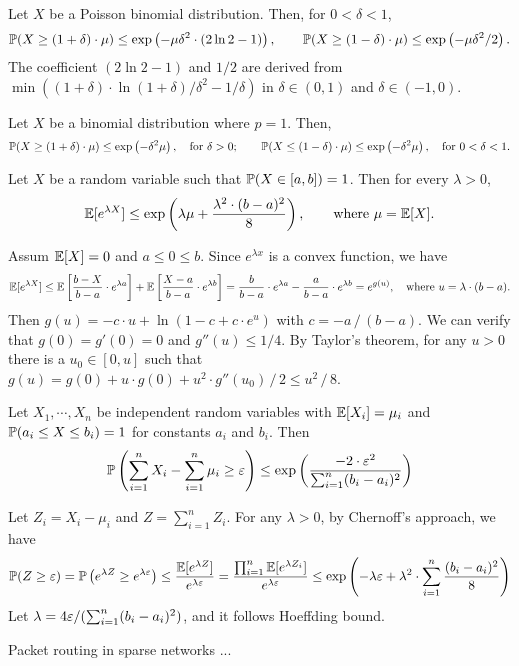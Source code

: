 \documentclass[main.tex]{subfiles}
\begin{document}
\begin{corollary}
	Let $X$ be a Poisson binomial distribution. Then, for $0<\delta<1$, 
	\[\mathbb{P}(X\ge(1+\delta)\cdot\mu)\le \exp\left(-\mu\delta^2\cdot (2\ln 2-1)\right),\qquad\mathbb{P}(X\ge(1-\delta)\cdot\mu)\le \exp\left(-\mu\delta^2/2\right).\]
	The coefficient $(2\ln 2-1)$ and $1/2$ are derived from $\min((1+\delta)\cdot \ln(1+\delta)/\delta^2 - 1/ \delta)$ in $\delta\in(0,1)$ and $\delta\in(-1,0)$.
\end{corollary}

\begin{theorem}
	Let $X$ be a binomial distribution where $p=1$. Then,
	\[
		\mathbb{P}(X\ge(1+\delta)\cdot\mu)\le \exp\left(-\delta^2\mu\right),\quad\text{for }\delta>0;\qquad
		\mathbb{P}(X\le(1-\delta)\cdot\mu)\le \exp\left(-\delta^2\mu\right),\quad\text{for }0<\delta<1.
	\]
\end{theorem}

\begin{lemma}
	Let $X$ be a random variable such that $\mathbb{P}(X\in[a,b])=1$. Then for every $\lambda>0$,
	\[\mathbb{E}[e^{\lambda X}]\le\exp\left(\lambda\mu+\frac{\lambda^2\cdot(b-a)^2}{8}\right),\qquad \text{where }\mu=\mathbb{E}[X].\]
\end{lemma}

\begin{pf}
	Assum $\mathbb{E}[X]=0$ and $a\le 0\le b$. Since $e^{\lambda x}$ is a convex function, we have
	\[\mathbb{E}[e^{\lambda X}]\le\mathbb{E}\left[\frac{b-X}{b-a}\cdot e^{\lambda a}\right] + \mathbb{E}\left[\frac{X-a}{b-a}\cdot e^{\lambda b}\right] = \frac{b}{b-a}\cdot e^{\lambda a} - \frac{a}{b-a}\cdot e^{\lambda b} = e^{g(u)},\quad\text{where }u=\lambda\cdot(b-a).\]
	Then $g(u)=-c\cdot u+\ln(1-c+c\cdot e^u)$ with $c=-a\,/\,(b-a)$. We can verify that $g(0)=g'(0)=0$ and $g''(u)\le 1/4$. By Taylor's theorem, for any $u > 0$ there is a $u_0\in[0,u]$ such that $g(u)=g(0)+u\cdot g(0)+u^2\cdot g''(u_0)\,/\,2\le u^2\,/\,8$.
\end{pf}

\begin{theorem}
	Let $X_1,\cdots,X_n$ be independent random variables with $\mathbb{E}[X_i]=\mu_i$ and $\mathbb{P}(a_i\le X\le b_i)=1$ for constants $a_i$ and $b_i$. Then
	\[
		\mathbb{P}\left(\sum_{i=1}^{n}X_i-\sum_{i=1}^{n}\mu_i\ge\varepsilon\right)\le \exp\left(\frac{-2\cdot\varepsilon^2}{\sum_{i=1}^{n}(b_i-a_i)^2}\right)
	\]
\end{theorem}

\begin{pf}
	Let $Z_i=X_i-\mu_i$ and $Z=\sum_{i=1}^{n}Z_i$. For any $\lambda>0$, by Chernoff's approach, we have
	\[
		\mathbb{P}(Z\ge\varepsilon)=\mathbb{P}\left(e^{\lambda Z}\ge e^{\lambda\varepsilon}\right) \le \frac{\mathbb{E}[e^{\lambda Z}]}{e^{\lambda \varepsilon}}=\frac{\prod_{i=1}^{n}\mathbb{E}[e^{\lambda Z_i}]}{e^{\lambda \varepsilon}}\le\exp\left(-\lambda\varepsilon+\lambda^2\cdot\sum_{i=1}^{n}\frac{(b_i-a_i)^2}{8}\right)
	\]
	Let $\lambda = 4\varepsilon / (\sum_{i=1}^{n}(b_i-a_i)^2)$, and it follows Hoeffding bound.
\end{pf}

\bigskip

{\bs Packet routing in sparse networks} ...

\bigskip




\end{document}
